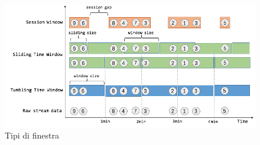 \begin{figure}[htbp]
    \centering
    \includegraphics[width=\textwidth]{images/flink/windows.png}
    \caption{Tipi di finestra}
    \label{fig:flink_window}
\end{figure}

